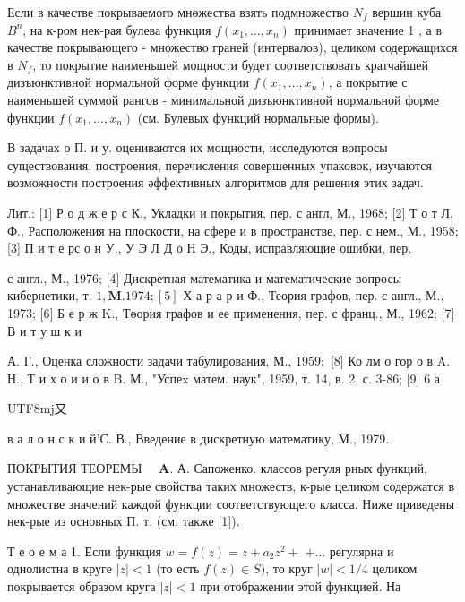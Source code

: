 \documentclass[10pt]{article}
\begin{document}
Если в качестве покрываемого мнөжества взять подмножество $N_{f}$ вершин куба $B^{n}$, на к-ром нек-рая булева функция $f\left(x_{1}, \ldots, x_{n}\right)$ принимает значение 1 , а в качестве покрывающего - множество граней (интервалов), целиком содержащихся в $N_{f}$, то покрытие наименьшей мощности будет соответствовать кратчайшей дизъюнктивной нормальной форме функции $f\left(x_{1}, \ldots, x_{n}\right)$, а покрытие с наименьшей суммой рангов - минимальной дизъюнктивной нормальной форме функции $f\left(x_{1}, \ldots, x_{n}\right)$ (см. Булевых функций нормальные формы).



В задачах о П. и у. оцениваются их мощности, исследуются вопросы существования, построения, перечисления совершенных упаковок, изучаются возможности построения әффективных алгоритмов для решения этих задач.



Лит.: [1] Р о д ж е р с К., Укладки и покрытия, пер. с англ, М., 1968; [2] Т о т Л. Ф., Расположения на плоскости, на сфере и в пространстве, пер. с нем., М., 1958; [3] П и т е рс о н У., У Э Л Д о Н Э., Коды, исправляющие ошибки, пер.

с англ., М., 1976; [4] Дискретная математика и математические вопросы кибернетики, т. $1, \mathbf{M} .1974 ;[5]$ Х а р а р и Ф., Теория графов, пер. с англ., М., 1973; [6] Б е р ж K., Төория графов и ее применения, пер. с франц., М., 1962; [7] В и т у ш к и

А. Г., Оценка сложности задачи табулирования, М., $1959 ;$ [8] Ко лм о гор о в A. Н., Т и х о и и о в B. М., "Успеx матем. наук", 1959, т. 14, в. 2, с. 3-86; [9] 6 а \begin{CJK}{UTF8}{mj}又\end{CJK} в а л о н с к и й'С. В., Введение в дискретную математику, М., 1979.



ПОКРЫТИЯ ТЕОРЕМЫ $\quad \boldsymbol{A}$. А. Сапоженко. классов регуля рных функций, устанавливающие нек-рые свойства таких множеств, к-рые целиком содержатся в множестве значений каждой функции соответствующего класса. Ниже приведены нек-рые из основных П. т. (см. также [1]).



Т е о е м а 1. Если функция $w=f(z)=z+a_{2} z^{2}+$ $+\ldots$ регулярна и однолистна в круге $|z|<1$ (то есть $f(z) \in S)$, то круг $|w|<1 / 4$ целиком покрывается образом круга $|z|<1$ при отображении этой функцией. На
\end{document}

